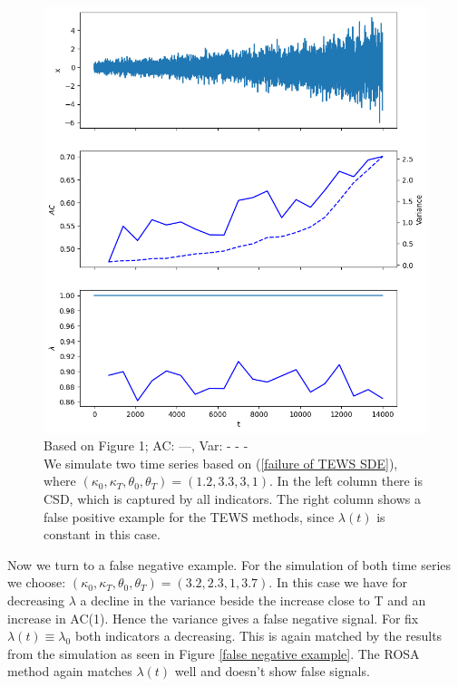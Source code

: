 \documentclass[%
thesis=student,%
coverpage=false,%
titlepage=false,%
headmarks=true, %
english,%
font=libertine, %
math=newpxtx, %
BCOR=5mm,%
coverBCOR=11mm%
]{tumbook}
\begin{document}
\begin{figure}
\begin{minipage}{0.49\textwidth}
        \includegraphics[width=\textwidth]{figures/false_positives.png}
    \end{minipage}
    \begin{minipage}{\textwidth}
    \centering
    \caption{Based on \cite{Morr:2024} Figure 1; AC: ---, Var: - - - \\
    We simulate two time series based on (\ref{failure of TEWS SDE}), where $(\kappa_{0},\kappa_{T},\theta_{0},\theta_{T}) = (1.2,3.3,3,1)$. In the left column there is CSD, which is captured by all indicators. The right column shows a false positive example for the TEWS methods, since $\lambda(t)$ is constant in this case. 
    }
    \label{false positive example}
    \end{minipage}
\end{figure}


Now we turn to a false negative example. For the simulation of both time series we choose: $(\kappa_{0},\kappa_{T},\theta_{0},\theta_{T}) = (3.2,2.3,1,3.7)$. In this case we have for decreasing $\lambda$ a decline in the variance beside the increase close to T and an increase in AC(1). Hence the variance gives a false negative signal. For fix $\lambda(t) \equiv \lambda_{0}$ both indicators a decreasing. This is again matched by the results from the simulation as seen in Figure \ref{false negative example}. The ROSA method again matches $\lambda(t)$ well and doesn't show false signals.
\end{document}
